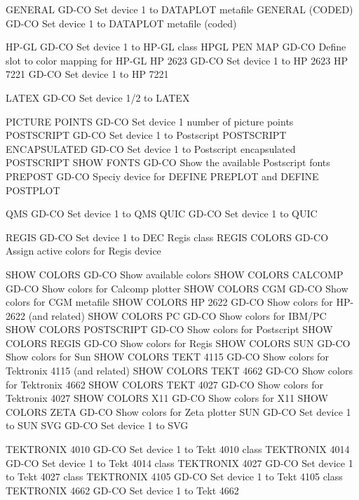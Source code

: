 GENERAL                     GD-CO Set device 1 to DATAPLOT metafile
GENERAL (CODED)             GD-CO Set device 1 to DATAPLOT metafile (coded)

HP-GL                       GD-CO Set device 1 to HP-GL class
HPGL PEN MAP                GD-CO Define slot to color mapping for HP-GL
HP 2623                     GD-CO Set device 1 to HP 2623
HP 7221                     GD-CO Set device 1 to HP 7221

LATEX                       GD-CO Set device 1/2 to LATEX

PICTURE POINTS              GD-CO Set device 1 number of picture points
POSTSCRIPT                  GD-CO Set device 1 to Postscript
POSTSCRIPT ENCAPSULATED     GD-CO Set device 1 to Postscript encapsulated
POSTSCRIPT SHOW FONTS       GD-CO Show the available Postscript fonts
PREPOST                     GD-CO Speciy device for DEFINE PREPLOT and DEFINE POSTPLOT

QMS                         GD-CO Set device 1 to QMS
QUIC                        GD-CO Set device 1 to QUIC

REGIS                       GD-CO Set device 1 to DEC Regis class
REGIS COLORS                GD-CO Assign active colors for Regis device

SHOW COLORS                 GD-CO Show available colors
SHOW COLORS CALCOMP         GD-CO Show colors for Calcomp plotter
SHOW COLORS CGM             GD-CO Show colors for CGM metafile
SHOW COLORS HP 2622         GD-CO Show colors for HP-2622 (and related)
SHOW COLORS PC              GD-CO Show colors for IBM/PC
SHOW COLORS POSTSCRIPT      GD-CO Show colors for Postscript
SHOW COLORS REGIS           GD-CO Show colors for Regis
SHOW COLORS SUN             GD-CO Show colors for Sun
SHOW COLORS TEKT 4115       GD-CO Show colors for Tektronix 4115 (and related)
SHOW COLORS TEKT 4662       GD-CO Show colors for Tektronix 4662
SHOW COLORS TEKT 4027       GD-CO Show colors for Tektronix 4027
SHOW COLORS X11             GD-CO Show colors for X11
SHOW COLORS ZETA            GD-CO Show colors for Zeta plotter
SUN                         GD-CO Set device 1 to SUN
SVG                         GD-CO Set device 1 to SVG

TEKTRONIX 4010              GD-CO Set device 1 to Tekt 4010 class
TEKTRONIX 4014              GD-CO Set device 1 to Tekt 4014 class
TEKTRONIX 4027              GD-CO Set device 1 to Tekt 4027 class
TEKTRONIX 4105              GD-CO Set device 1 to Tekt 4105 class
TEKTRONIX 4662              GD-CO Set device 1 to Tekt 4662

